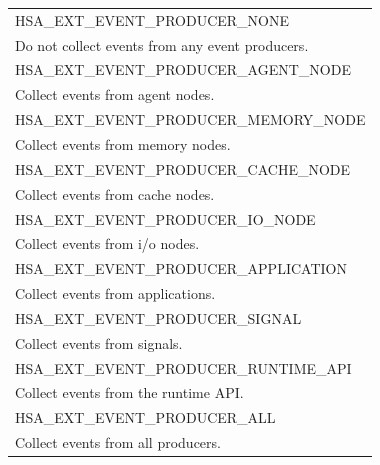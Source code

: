 \documentclass[final,oneside]{book}
\newcommand{\reftyp}[1]{#1}
\newcommand{\refenu}[1]{\reftyp{#1}}
\begin{document}
\begin{longtable}{@{\hspace{2em}}p{\linewidth-2em}}
\hspace{-2em}\refenu{HSA_\-EXT_\-EVENT_\-PRODUCER_\-NONE}\\Do not collect events from any event producers.\\[2mm]
\hspace{-2em}\refenu{HSA_\-EXT_\-EVENT_\-PRODUCER_\-AGENT_\-NODE}\\Collect events from agent nodes.\\[2mm]
\hspace{-2em}\refenu{HSA_\-EXT_\-EVENT_\-PRODUCER_\-MEMORY_\-NODE}\\Collect events from memory nodes.\\[2mm]
\hspace{-2em}\refenu{HSA_\-EXT_\-EVENT_\-PRODUCER_\-CACHE_\-NODE}\\Collect events from cache nodes.\\[2mm]
\hspace{-2em}\refenu{HSA_\-EXT_\-EVENT_\-PRODUCER_\-IO_\-NODE}\\Collect events from i/o nodes.\\[2mm]
\hspace{-2em}\refenu{HSA_\-EXT_\-EVENT_\-PRODUCER_\-APPLICATION}\\Collect events from applications.\\[2mm]
\hspace{-2em}\refenu{HSA_\-EXT_\-EVENT_\-PRODUCER_\-SIGNAL}\\Collect events from signals.\\[2mm]
\hspace{-2em}\refenu{HSA_\-EXT_\-EVENT_\-PRODUCER_\-RUNTIME_\-API}\\Collect events from the runtime API.\\[2mm]
\hspace{-2em}\refenu{HSA_\-EXT_\-EVENT_\-PRODUCER_\-ALL}\\Collect events from all producers.
\end{longtable}
\end{document}
